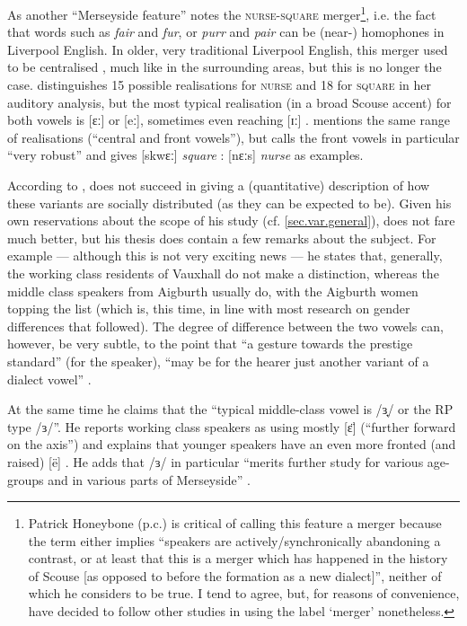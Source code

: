 As another ``Merseyside feature'' \citet[72]{trudgill1999} notes the \textsc{nurse}-\textsc{square} merger\footnote{Patrick Honeybone (p.c.) is critical of calling this feature a merger because the term either implies \enquote{speakers are actively/synchronically abandoning a contrast, or at least that this is a merger which has happened in the history of Scouse [as opposed to before the formation as a new dialect]}, neither of which he considers to be true. I tend to agree, but, for reasons of convenience, have decided to follow other studies \parencite{trudgill1999,watsonclark2013} in using the label \enquote*{merger} nonetheless.}, i.e. the fact that words such as \emph{fair} and \emph{fur}, or \emph{purr} and \emph{pair} can be (near-) homophones in Liverpool English.
In older, very traditional Liverpool English, this merger used to be centralised \parencite[cf.][323]{west2015}, much like in the surrounding areas, but this is no longer the case.
\citet[cf.][68 and 71]{delyon1981} distinguishes 15 possible realisations for \textsc{nurse} and 18 for \textsc{square} in her auditory analysis, but the most typical realisation (in a broad Scouse accent) for both vowels is [ɛː] or [eː], sometimes even reaching [ɪː] \citep[cf.][358]{watson2007}.
\citet[127]{honeybone2007} mentions the same range of realisations (``central and front vowels''), but calls the front vowels in particular ``very robust'' and gives [skwɛː] \emph{square} : [nɛːs] \emph{nurse} as examples.

According to \citet[358]{watson2007}, \textcite{delyon1981} does not succeed in giving a (quantitative) description of how these variants are socially distributed (as they can be expected to be).
Given his own reservations about the scope of his study (cf. \ref{sec.var.general}), \citet{knowles1973} does not fare much better, but his thesis does contain a few remarks about the subject.
For example --- although this is not very exciting news --- he states that, generally, the working class residents of Vauxhall do not make a distinction, whereas the middle class speakers from Aigburth usually do, with the Aigburth women topping the list (which is, this time, in line with most research on gender differences that followed).
The degree of difference between the two vowels can, however, be very subtle, to the point that ``a gesture towards the prestige standard'' (for the speaker), ``may be for the hearer just another variant of a dialect vowel'' \citep[cf.][295--297]{knowles1973}.

At the same time he claims that the ``typical middle-class vowel is /ɜ̟/ or the RP type /ɜ/''. He reports working class speakers as using mostly [ɛ̈] (``further forward on the axis'') and explains that younger speakers have an even more fronted (and raised) [ë] \citep[271]{knowles1973}.
He adds that /ɜ/ in particular ``merits further study for various age-groups and in various parts of Merseyside'' \citeyearpar[320]{knowles1973}.

